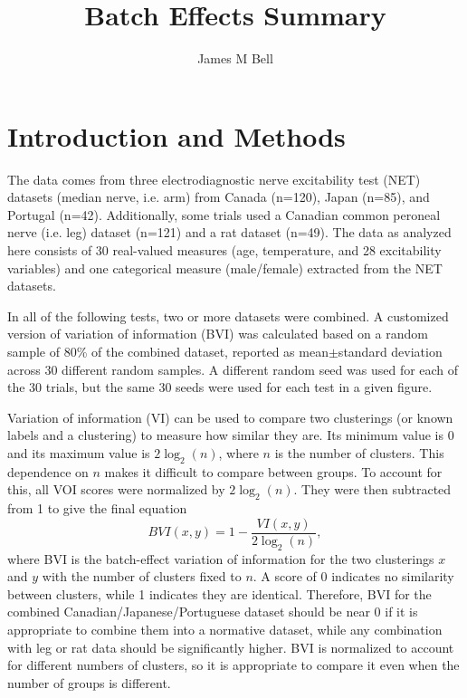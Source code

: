 \documentclass[12pt]{article}
\title{Batch Effects Summary}
\author{James M Bell}
\begin{document}
\maketitle

\section*{Introduction and Methods}

The data comes from three electrodiagnostic nerve excitability test (NET) datasets (median nerve, i.e. arm) from Canada (n=120), Japan (n=85), and Portugal (n=42). Additionally, some trials used a Canadian common peroneal nerve (i.e. leg) dataset (n=121) and a rat dataset (n=49). The data as analyzed here consists of 30 real-valued measures (age, temperature, and 28 excitability variables) and one categorical measure (male/female) extracted from the NET datasets.

In all of the following tests, two or more datasets were combined. A customized version of variation of information (BVI) was calculated based on a random sample of 80\% of the combined dataset, reported as mean$\pm$standard deviation across 30 different random samples. A different random seed was used for each of the 30 trials, but the same 30 seeds were used for each test in a given figure.

Variation of information (VI) can be used to compare two clusterings (or known labels and a clustering) to measure how similar they are. Its minimum value is 0 and its maximum value is $2\log_2(n)$, where $n$ is the number of clusters. This dependence on $n$ makes it difficult to compare between groups. To account for this, all VOI scores were normalized by $2\log_2(n)$. They were then subtracted from 1 to give the final equation
\begin{equation}
BVI(x,y) = 1-\frac{VI(x,y)}{2\log_2(n)},
\end{equation}
where BVI is the batch-effect variation of information for the two clusterings $x$ and $y$ with the number of clusters fixed to $n$. A score of 0 indicates no similarity between clusters, while 1 indicates they are identical. Therefore, BVI for the combined Canadian/Japanese/Portuguese dataset should be near 0 if it is appropriate to combine them into a normative dataset, while any combination with leg or rat data should be significantly higher. BVI is normalized to account for different numbers of clusters, so it is appropriate to compare it even when the number of groups is different.
\end{document}
